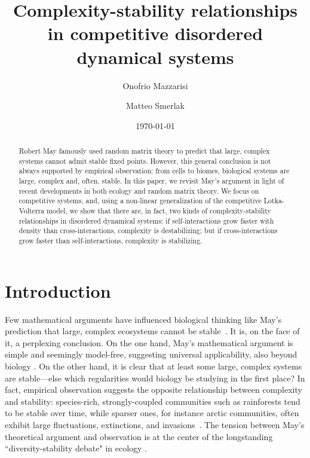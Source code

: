 \documentclass[
 pre,
 twocolumn,
 amsmath,
 amssymb,
 aps,
]{revtex4-2}
\begin{document}
\title{Complexity-stability relationships in competitive disordered dynamical systems}

\author{Onofrio Mazzarisi}

\author{Matteo Smerlak}


\date{\today}

\begin{abstract}
    Robert May famously used random matrix theory to predict that large, complex systems cannot admit stable fixed points. 
    However, this general conclusion is not always supported by empirical observation: from cells to biomes, biological systems are large, complex and, often, stable.
    In this paper, we revisit May's argument in light of recent developments in both ecology and random matrix theory. 
    We focus on competitive systems, and, using a non-linear generalization of the competitive Lotka-Volterra model, we show that there are, in fact, two kinds of complexity-stability relationships in disordered dynamical systems:
    if self-interactions grow faster with density than cross-interactions, complexity is destabilizing; but if cross-interactions grow faster than self-interactions, complexity is stabilizing.
\end{abstract}

\maketitle

\section{Introduction}
Few mathematical arguments have influenced biological thinking like May's prediction that large, complex ecosystems cannot be stable~\cite{May1972}.
It is, on the face of it, a perplexing conclusion.
On the one hand, May's mathematical argument is simple and seemingly model-free, suggesting universal applicability, also beyond biology \cite{Haldane2011, Moran2019}.
On the other hand, it is clear that at least some large, complex systems are stable---else which regularities would biology be studying in the first place? 
In fact, empirical observation suggests the opposite relationship between complexity and stability: species-rich, strongly-coupled communities such as rainforests tend to be stable over time, while sparser ones, for instance arctic communities, often exhibit large fluctuations, extinctions, and invasions~\cite{Hutchinson1959,Odum1959,MacArthur1955}. 
The tension between May's theoretical argument and observation is at the center of the longstanding ``diversity-stability debate" in ecology \cite{McCann2000, Loreau2022,Hatton2024}.
\end{document}
